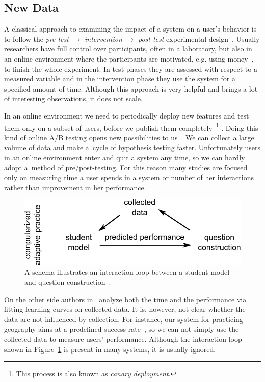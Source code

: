\documentclass[table,color,cover,twoside,nolot,nolof]{fithesis3/fithesis3}
\begin{document}
\subsection{New Data}

A classical approach to examining the impact of a system on a user's
behavior is to follow the \emph{pre-test} $\rightarrow$ \emph{intervention}
$\rightarrow$ \emph{post-test} experimental design~\cite{dimitrov2003pretest}.
Usually researchers have full control over participants, often in a
laboratory, but also in an online environment where the participants are
motivated, e.g. using money~\cite{maass2015how}, to finish the whole
experiment. In test phases they are assessed with respect to a measured
variable and in the intervention phase they use the system for a specified
amount of time. Although this approach is very helpful and brings a lot of
interesting observations, it does not scale.

In an online environment we need to periodically deploy new features and
test them only on a subset of users, before we publish them
completely~\footnote{This process is also known as \emph{canary deployment}.} .
Doing this kind of online A/B testing opens new possibilities to
us~\cite{stamper2012rise}. We can collect a large volume of data and make
a~cycle of hypothesis testing faster. Unfortunately users in an online
environment enter and quit a system any time, so we can hardly adopt a~method
of pre/post-testing. For this reason many studies are focused only on measuring
time a user spends in a system or number of her
interactions~\cite{papousek2015impact,monterrat2015player} rather than
improvement in her performance.

\begin{figure}[h]
	\begin{center}
		\includegraphics[width=.7\textwidth]{figure/interaction_loop}
	\end{center}
	\caption{A schema illustrates an interaction loop between a student model and
		question construction~\cite{niznan2015exploring}.}
	\label{figure:interaction_loop}
\end{figure}

On the other side authors in~\cite{lomas2013optimizing} analyze both the time
and the performance via fitting learning curves on collected data. It is, however,
not clear whether the data are not influenced by collection. For instance, our
system for practicing geography aims at a predefined success
rate~\cite{papousek2014adaptive}, so we can not simply use the collected data
to measure users' performance. Although the interaction loop shown in
Figure~\ref{figure:interaction_loop} is present in many systems, it is usually
ignored.
\end{document}
